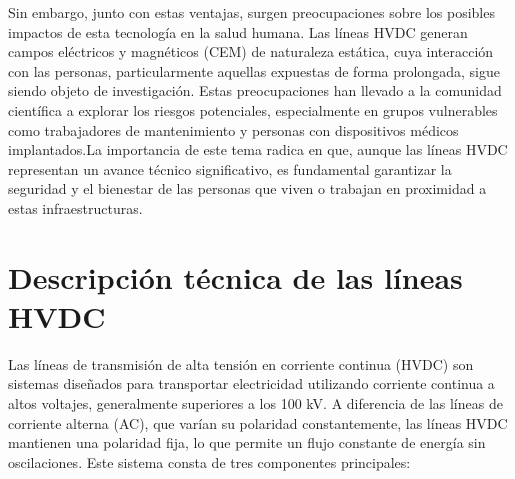 Sin embargo, junto con estas ventajas, surgen preocupaciones sobre los posibles impactos de esta tecnología en la salud humana. Las líneas HVDC generan campos eléctricos y magnéticos (CEM) de naturaleza estática, cuya interacción con las personas, particularmente aquellas expuestas de forma prolongada, sigue siendo objeto de investigación. Estas preocupaciones han llevado a la comunidad científica a explorar los riesgos potenciales, especialmente en grupos vulnerables como trabajadores de mantenimiento y personas con dispositivos médicos implantados.La importancia de este tema radica en que, aunque las líneas HVDC representan un avance técnico significativo, es fundamental garantizar la seguridad y el bienestar de las personas que viven o trabajan en proximidad a estas infraestructuras. 
\section{Descripción técnica de las líneas HVDC}

Las líneas de transmisión de alta tensión en corriente continua (HVDC) son sistemas diseñados para transportar electricidad utilizando corriente continua a altos voltajes, generalmente superiores a los 100 kV. A diferencia de las líneas de corriente alterna (AC), que varían su polaridad constantemente, las líneas HVDC mantienen una polaridad fija, lo que permite un flujo constante de energía sin oscilaciones. Este sistema consta de tres componentes principales:

